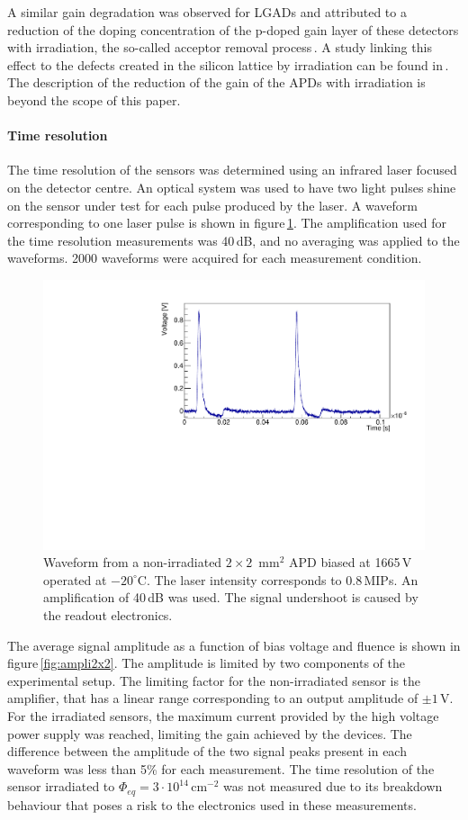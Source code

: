 \documentclass[review,number,sort&compress]{elsarticle}
\begin{document}
A similar gain degradation was observed for LGADs and attributed to a reduction of the doping concentration of the p-doped gain layer of these detectors with irradiation, the so-called acceptor removal process\,\cite{kramberger2015}.
A study linking this effect to the defects created in the silicon lattice by irradiation can be found in\,\cite{gurimskaya2019}.
The description of the reduction of the gain of the APDs with irradiation is beyond the scope of this paper.

\paragraph{Time resolution}
The time resolution of the sensors was determined using an infrared laser focused on the detector centre.
An optical system was used to have two light pulses shine on the sensor under test for each pulse produced by the laser.
A waveform corresponding to one laser pulse is shown in figure\,\ref{fig:pulses2x2timing}.
The amplification used for the time resolution measurements was 40\,dB, and no averaging was applied to the waveforms.
2000 waveforms were acquired for each measurement condition.

\begin{figure}
  \centering
  \includegraphics[width = 0.6 \columnwidth]{APD_394-1-51_1665V_evt1100_2pulses}
  \caption{Waveform from a non-irradiated $2 \times 2$~mm$^2$ APD biased at 1665\,V operated at $-20^\circ$C. The laser intensity corresponds to 0.8\,MIPs. An amplification of 40\,dB was used. The signal undershoot is caused by the readout electronics.}
  \label{fig:pulses2x2timing}
\end{figure}

The average signal amplitude as a function of bias voltage and fluence is shown in figure\,\ref{fig:ampli2x2}.
The amplitude is limited by two components of the experimental setup.
The limiting factor for the non-irradiated sensor is the amplifier, that has a linear range corresponding to an output amplitude of $\pm 1$\,V.
For the irradiated sensors, the maximum current provided by the high voltage power supply was reached, limiting the gain achieved by the devices.
The difference between the amplitude of the two signal peaks present in each waveform was less than 5\% for each measurement.
The time resolution of the sensor irradiated to $\Phi_{eq} = 3 \cdot 10^{14}$\,cm$^{-2}$ was not measured due to its breakdown behaviour that poses a risk to the electronics used in these measurements.
\end{document}
